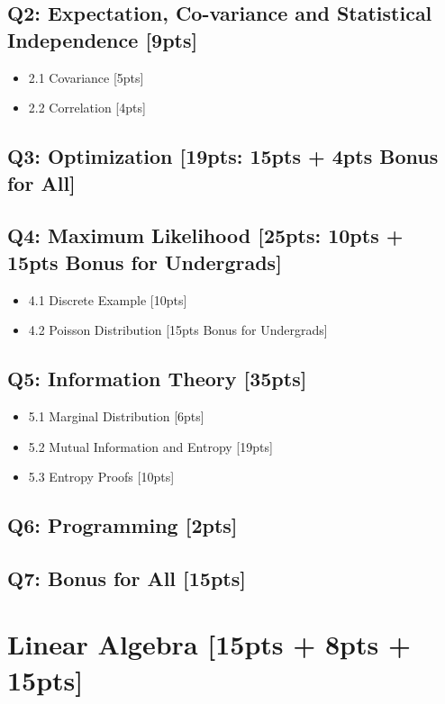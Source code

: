 \documentclass{article}
\begin{document}
\subsection*{Q2: Expectation, Co-variance and Statistical Independence [9pts]}
\begin{itemize}
    \item 2.1 Covariance [5pts]
    \item 2.2 Correlation [4pts]
\end{itemize}
\subsection*{Q3: Optimization [19pts: 15pts + 4pts Bonus for All]}
\subsection*{Q4: Maximum Likelihood [25pts: 10pts + 15pts Bonus for Undergrads]}
\begin{itemize}
    \item 4.1 Discrete Example [10pts]
    \item 4.2 Poisson Distribution [15pts Bonus for Undergrads]
\end{itemize}
\subsection*{Q5: Information Theory [35pts]}
\begin{itemize}
    \item 5.1 Marginal Distribution [6pts]
    \item 5.2 Mutual Information and Entropy [19pts]
    \item 5.3 Entropy Proofs [10pts]
\end{itemize}
\subsection*{Q6: Programming [2pts]}
\subsection*{Q7: Bonus for All [15pts]}
\newpage

\section{Linear Algebra [15pts + 8pts + 15pts]}
\end{document}
